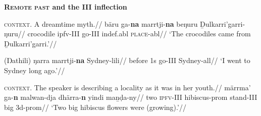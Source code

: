 \pex\textbf{\textsc{Remote past} and the \gls{III} inflection}


\a\begingl\glpreamble\textsc{context.} A dreamtime myth.//
\gla bäru ga-\textbf{na} marrtji-\textbf{na} beŋuru Ḏulkarri'garri-ŋuru//
\glb crocodile \gls{ipfv}-\gls{III} go-\gls{III} \gls{indef}.\gls{abl} \textsc{place}-\gls{abl}//
\glft`The crocodiles came from Ḏulkarri'garri.'//\endgl

\a{}\begingl\gla (Ŋathili) ŋarra marrtji-\textbf{na} Sydney-lili//
\glb before 1s go-\gls{III} Sydney-\gls{all}//
\glft`I went to Sydney long ago.'\trailingcitation{[DhG~20190504]}//\endgl

\a{}\begingl\glpreamble\textsc{context.} The speaker is describing a locality as it was in her youth.//
\gla märrma' ga-\textbf{n} malwan-dja dhärra-\textbf{n} yindi maṉḍa-ny//
\glb two \textsc{ipfv}-\gls{III} hibiscus-\gls{prom} stand-\gls{III} big 3d-\gls{prom}//
\glft`Two big hibiscus flowers were (growing).'//\endgl







\xe


